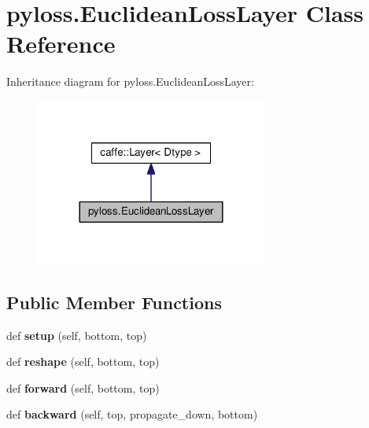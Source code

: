 \hypertarget{classpyloss_1_1_euclidean_loss_layer}{}\section{pyloss.\+Euclidean\+Loss\+Layer Class Reference}
\label{classpyloss_1_1_euclidean_loss_layer}


Inheritance diagram for pyloss.\+Euclidean\+Loss\+Layer\+:
\nopagebreak
\begin{figure}[H]
\begin{center}
\leavevmode
\includegraphics[width=216pt]{classpyloss_1_1_euclidean_loss_layer__inherit__graph}
\end{center}
\end{figure}
\subsection*{Public Member Functions}
\begin{DoxyCompactItemize}
\item 
\mbox{\label{classpyloss_1_1_euclidean_loss_layer_aeb6b1833a01f63e53d4b317d0655b139}} 
def {\bfseries setup} (self, bottom, top)
\item 
\mbox{\label{classpyloss_1_1_euclidean_loss_layer_a086a28287ea4064aa3082be5afb8f794}} 
def {\bfseries reshape} (self, bottom, top)
\item 
\mbox{\label{classpyloss_1_1_euclidean_loss_layer_a8fced37e6bdfdf70b7b9857be957e556}} 
def {\bfseries forward} (self, bottom, top)
\item 
\mbox{\label{classpyloss_1_1_euclidean_loss_layer_a0d09630f39f8759f63b54a1727185912}} 
def {\bfseries backward} (self, top, propagate\+\_\+down, bottom)
\end{DoxyCompactItemize}
